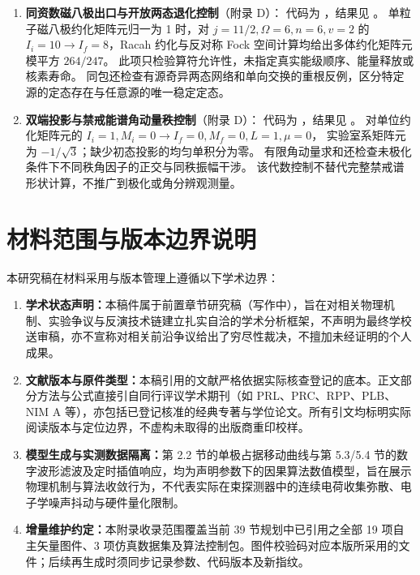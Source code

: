 \begin{enumerate}[label=(\arabic*),leftmargin=2em]
    \item \textbf{同资数磁八极出口与开放两态退化控制}（附录 D）：
    代码为 ，结果见
    。
    单粒子磁八极约化矩阵元归一为 1 时，对 $j=11/2,\Omega=6,n=6,v=2$ 的
    $I_i=10\to I_f=8$，Racah 约化与反对称 Fock 空间计算均给出多体约化矩阵元模平方 $264/247$。
    此项只检验算符允许性，未指定真实能级顺序、能量释放或核素寿命。
    同包还检查有源奇异两态网络和单向交换的重根反例，区分特定源的定态存在与任意源的唯一稳定定态。
    \vspace{1ex}
    \item \textbf{双端投影与禁戒能谱角动量秩控制}（附录 D）：
    代码为 ，结果见
    。
    对单位约化矩阵元的 $I_i=1,M_i=0\to I_f=0,M_f=0,L=1,\mu=0$，
    实验室系矩阵元为 $-1/\sqrt3$；缺少初态投影的均匀单积分为零。
    有限角动量求和还检查未极化条件下不同秩角因子的正交与同秩振幅干涉。
    该代数控制不替代完整禁戒谱形状计算，不推广到极化或角分辨观测量。
\end{enumerate}

\section{材料范围与版本边界说明}\label{sec:appF-scope-boundary}

本研究稿在材料采用与版本管理上遵循以下学术边界：
\begin{enumerate}[label=(\arabic*),leftmargin=2em]
    \item \textbf{学术状态声明：}本稿件属于前置章节研究稿（写作中），旨在对相关物理机制、实验争议与反演技术链建立扎实自洽的学术分析框架，不声明为最终学校送审稿，亦不宣称对相关前沿争议给出了穷尽性裁决，不擅加未经证明的个人成果。
    \item \textbf{文献版本与原件类型：}本稿引用的文献严格依据实际核查登记的底本。正文部分方法与公式直接引自同行评议学术期刊（如 PRL、PRC、RPP、PLB、NIM A 等），亦包括已登记核准的经典专著与学位论文。所有引文均标明实际阅读版本与定位边界，不虚构未取得的出版商重印校样。
    \item \textbf{模型生成与实测数据隔离：}第 2.2 节的单极占据移动曲线与第 5.3/5.4 节的数字波形滤波及定时插值响应，均为声明参数下的因果算法数值模型，旨在展示物理机制与算法收敛行为，不代表实际在束探测器中的连续电荷收集弥散、电子学噪声抖动与硬件量化限制。
    \item \textbf{增量维护约定：}本附录收录范围覆盖当前 39 节规划中已引用之全部 19 项自主矢量图件、3 项仿真数据集及算法控制包。图件校验码对应本版所采用的文件；后续再生成时须同步记录参数、代码版本及新指纹。
\end{enumerate}
